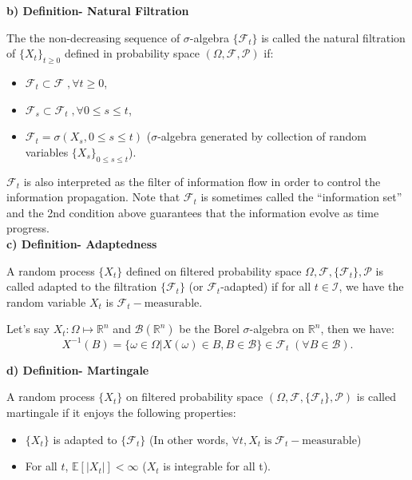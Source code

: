 \documentclass[12pt,a4paper,oneside]{book}
\begin{document}
	\textbf{b) Definition- Natural Filtration}
	
	The the non-decreasing sequence of $\sigma$-algebra $\{\mathcal{F}_t\}$ is called the natural filtration of $\{X_t\}_{t\geq 0}$ defined in probability space $(\Omega, \mathcal{F}, \mathcal{P})$ if: 
	\begin{itemize}[label=$\bullet$]
		\item $\mathcal{F}_t \subset \mathcal{F}\; , \forall t\geq 0$,
		\item $\mathcal{F}_s \subset \mathcal{F}_t \; ,\forall 0\leq s\leq t$,
		\item $\mathcal{F}_t= \sigma(X_s, 0\leq s\leq t)$ ($\sigma$-algebra generated by collection of random variables $\{X_s\}_{0\leq s\leq t}$).
	\end{itemize} 

	$\mathcal{F}_t$ is also interpreted as the filter of information flow in order to control the information propagation. Note that $\mathcal{F}_t$ is sometimes called the ``information set'' and the 2nd condition above guarantees that the information evolve as time progress. \\

	\textbf{c) Definition- Adaptedness}
	
	A random process $\{X_t\}$ defined on filtered probability space $\Omega, \mathcal{F}, \{\mathcal{F}_t\}, \mathcal{P}$ is called adapted to the filtration $\{\mathcal{F}_t\}$ (or $\mathcal{F}_t$-adapted) if for all $t\in \mathcal{I}$, we have the random variable $X_t$ is $\mathcal{F}_t-\text{measurable}$. 
	
	Let's say $X_t: \Omega \mapsto \mathbb{R}^n$ and $\mathcal{B}(\mathbb{R}^n)$ be the Borel $\sigma$-algebra on $\mathbb{R}^n$, then we have:
	\[X^{-1}(B)=\{\omega \in \Omega| X(\omega)\in B, B\in \mathcal{B}\} \in \mathcal{F}_t \; (\forall B\in \mathcal{B}).\]
	
	\textbf{d) Definition- Martingale}
	
	A random process $\{X_t\}$ on filtered probability space $(\Omega,\mathcal{F},\{\mathcal{F}_t\},\mathcal{P})$ is called martingale if it enjoys the following properties:
	
	\begin{itemize}[label=$\bullet$]
		\item $\{X_t\}$ is adapted to $\{\mathcal{F}_t\}$ (In other words, $\forall t, X_t \;\text{is} \;\mathcal{F}_t-\text{measurable}$)
		\item For all $t$, $\mathbb{E}[|X_t|]< \infty$ ($X_t$ is integrable for all t).
	\end{itemize} 
	
\end{document}
